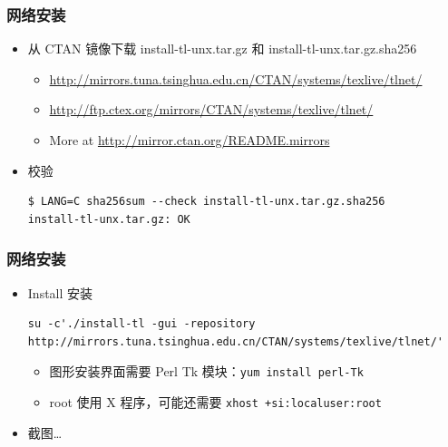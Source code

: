 \documentclass{beamer}
\begin{document}
\begin{frame}[fragile]
  \frametitle{网络安装}
  \begin{itemize}
    \item
从 CTAN 镜像下载
install-tl-unx.tar.gz
和
install-tl-unx.tar.gz.sha256
\begin{itemize} %
  \item \url{http://mirrors.tuna.tsinghua.edu.cn/CTAN/systems/texlive/tlnet/}
  \item \url{http://ftp.ctex.org/mirrors/CTAN/systems/texlive/tlnet/}
  \item More at \url{http://mirror.ctan.org/README.mirrors}
\end{itemize}

\item 校验
\begin{lstlisting}
$ LANG=C sha256sum --check install-tl-unx.tar.gz.sha256
install-tl-unx.tar.gz: OK
\end{lstlisting}

  \end{itemize}
\end{frame}

\begin{frame}[fragile]
  \frametitle{网络安装}
  \begin{itemize}
    \item Install 安装
      \begin{lstlisting}
su -c'./install-tl -gui -repository http://mirrors.tuna.tsinghua.edu.cn/CTAN/systems/texlive/tlnet/'
      \end{lstlisting}

      \begin{itemize}
        \item 图形安装界面需要 Perl Tk 模块：\texttt{yum install
          perl-Tk}
        \item root 使用 X 程序，可能还需要 \texttt{xhost
          +si:localuser:root}
      \end{itemize}
\item 截图\dots
\end{itemize}
\end{frame}
\end{document}
